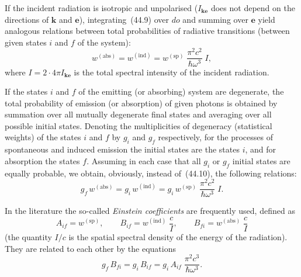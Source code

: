 If the incident radiation is isotropic and unpolarised ($I_{\mathbf{k}\mathbf{e}}$ does not depend on the directions of $\mathbf{k}$ and $\mathbf{e}$), integrating~(44.9) over $do$ and summing over $\mathbf{e}$ yield analogous relations between total probabilities of radiative transitions (between given states $i$ and $f$ of the system):
\begin{equation}
w^{(\mathrm{abs})} = w^{(\mathrm{ind})} = w^{(\mathrm{sp})}\;\frac{\pi^2c^2}{\hbar\omega^3}\;I,
\tag{44.10}
\end{equation}
where $I = 2\cdot 4\pi I_{\mathbf{k}\mathbf{e}}$ is the total spectral intensity of the incident radiation.

If the states $i$ and $f$ of the emitting (or absorbing) system are degenerate, the total probability of emission (or absorption) of given photons is obtained by summation over all mutually degenerate final states and averaging over all possible initial states. Denoting the multiplicities of degeneracy (statistical weights) of the states $i$ and $f$ by $g_i$ and $g_f$ respectively, for the processes of spontaneous and induced emission the initial states are the states $i$, and for absorption the states $f$. Assuming in each case that all $g_i$ or $g_f$ initial states are equally probable, we obtain, obviously, instead of~(44.10), the following relations:
\begin{equation}
g_f\,w^{(\mathrm{abs})} = g_i\,w^{(\mathrm{ind})} = g_i\,w^{(\mathrm{sp})}\;\frac{\pi^2c^2}{\hbar\omega^3}\;I.
\tag{44.11}
\end{equation}

In the literature the so-called \textit{Einstein coefficients} are frequently used, defined as
\begin{equation}
A_{if} = w^{(\mathrm{sp})},\qquad B_{if} = w^{(\mathrm{ind})}\;\frac{c}{I},\qquad B_{fi} = w^{(\mathrm{abs})}\;\frac{c}{I}
\tag{44.12}
\end{equation}
(the quantity $I/c$ is the spatial spectral density of the energy of the radiation). They are related to each other by the equations
\begin{equation}
g_f\,B_{fi} = g_i\,B_{if} = g_i\,A_{if}\;\frac{\pi^2c^3}{\hbar\omega^3}.
\tag{44.13}
\end{equation}
